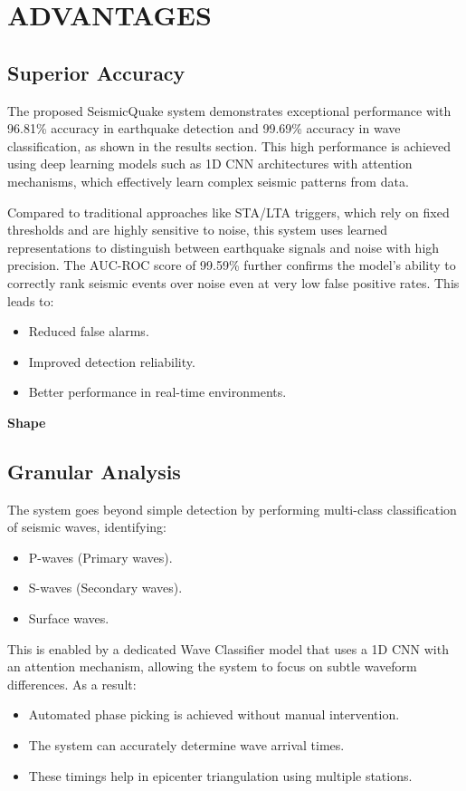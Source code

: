 \documentclass[a4paper,12pt]{report}
\begin{document}
\section{ADVANTAGES}
\label{sec:advantages}

\subsection{Superior Accuracy}
The proposed SeismicQuake system demonstrates exceptional performance with 96.81\% accuracy in earthquake detection and 99.69\% accuracy in wave classification, as shown in the results section. This high performance is achieved using deep learning models such as 1D CNN architectures with attention mechanisms, which effectively learn complex seismic patterns from data.

Compared to traditional approaches like STA/LTA triggers, which rely on fixed thresholds and are highly sensitive to noise, this system uses learned representations to distinguish between earthquake signals and noise with high precision. The AUC-ROC score of 99.59\% further confirms the model's ability to correctly rank seismic events over noise even at very low false positive rates. This leads to:
\begin{itemize}
\item Reduced false alarms.
\item Improved detection reliability.
\item Better performance in real-time environments.
\end{itemize}
\textbf{Shape}

\subsection{Granular Analysis}
The system goes beyond simple detection by performing multi-class classification of seismic waves, identifying:
\begin{itemize}
\item P-waves (Primary waves).
\item S-waves (Secondary waves).
\item Surface waves.
\end{itemize}

This is enabled by a dedicated Wave Classifier model that uses a 1D CNN with an attention mechanism, allowing the system to focus on subtle waveform differences. As a result:
\begin{itemize}
\item Automated phase picking is achieved without manual intervention.
\item The system can accurately determine wave arrival times.
\item These timings help in epicenter triangulation using multiple stations.
\end{itemize}
\end{document}
